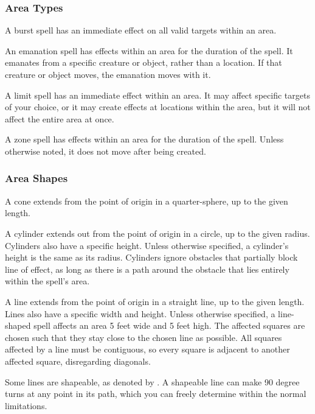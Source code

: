 \subsubsection{Area Types}

 A burst spell has an immediate effect on all valid targets within an area.

 An emanation spell has effects within an area for the duration of the spell. It emanates from a specific creature or object, rather than a location. If that creature or object moves, the emanation moves with it.

 A limit spell has an immediate effect within an area. It may affect specific targets of your choice, or it may create effects at locations within the area, but it will not affect the entire area at once.

 A zone spell has effects within an area for the duration of the spell. Unless otherwise noted, it does not move after being created.

\subsubsection{Area Shapes}

 A cone extends from the point of origin in a quarter-sphere, up to the given length.

 A cylinder extends out from the point of origin in a circle, up to the given radius. Cylinders also have a specific height. Unless otherwise specified, a cylinder's height is the same as its radius. Cylinders ignore obstacles that partially block line of effect, as long as there is a path around the obstacle that lies entirely within the spell's area.

 A line extends from the point of origin in a straight line, up to the given length. Lines also have a specific width and height. Unless otherwise specified, a line-shaped spell affects an area 5 feet wide and 5 feet high. The affected squares are chosen such that they stay close to the chosen line as possible. All squares affected by a line must be contiguous, so every square is adjacent to another affected square, disregarding diagonals.

\label{Shapeable} Some lines are shapeable, as denoted by \shapeable. A shapeable line can make 90 degree turns at any point in its path, which you can freely determine within the normal limitations.

